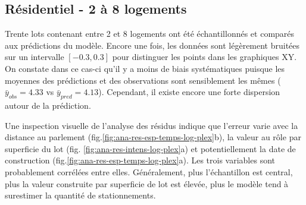 \subsection{Résidentiel - 2 à 8 logements}
Trente lots contenant entre 2 et 8 logements ont été échantillonnés et comparés aux prédictions du modèle. Encore une fois, les données sont légèrement bruitées sur un intervalle $[-0.3,0.3]$ pour distinguer les points dans les graphiques XY. On constate dans ce cas-ci qu'il y a moins de biais systématiques puisque les moyennes des prédictions et des observations sont sensiblement les mêmes ($\bar{y}_{obs} = 4.33$ vs $\bar{y}_{pred} = 4.13$). Cependant, il existe encore une forte dispersion autour de la prédiction.\par
Une inspection visuelle de l'analyse des résidus indique que l'erreur varie avec la distance au parlement (fig.\ref{fig:ana-res-esp-temps-log-plex}b), la valeur au rôle par superficie du lot (fig. \ref{fig:ana-res-intens-log-plex}a) et potentiellement la date de construction (fig.\ref{fig:ana-res-esp-temps-log-plex}a). Les trois variables sont probablement corrélées entre elles. Généralement, plus l'échantillon est central, plus la valeur construite par superficie de lot est élevée, plus le modèle tend à surestimer la quantité de stationnements.
